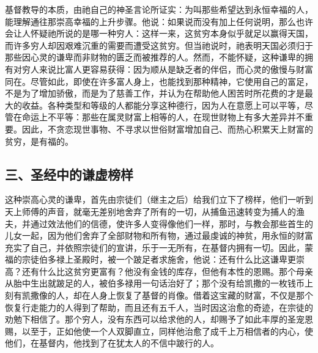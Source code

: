 基督教导的本质，由祂自己的神圣言论所证实：为叫那些希望达到永恒幸福的人，能理解通往那崇高幸福的上升步骤。他说：如果说而没有加上任何说明，那么也许会让人怀疑祂所说的是哪一种穷人：这样一来，这贫穷本身似乎就足以赢得天国，而许多穷人却因艰难沉重的需要而遭受这贫穷。但当祂说时，祂表明天国必须归于那些因心灵的谦卑而非财物的匮乏而被推荐的人。然而，不能怀疑，这种谦卑的拥有对穷人来说比富人更容易获得：因为顺从是缺乏者的伴侣，而心灵的傲慢与财富同在。尽管如此，即使在许多富人身上，也能找到那种精神，它使用自己的富足，不是为了增加骄傲，而是为了慈善工作，并认为在帮助他人困苦时所花费的才是最大的收益。各种类型和等级的人都能分享这种德行，因为人在意愿上可以平等，尽管在命运上不平等：那些在属灵财富上相等的人，在现世财物上有多大差异并不重要。因此，不贪恋现世事物、不寻求以世俗财富增加自己、而热心积累天上财富的贫穷，是有福的。\par


\subsection{三、圣经中的谦虚榜样}

这种崇高心灵的谦卑，首先由宗徒们（继主之后）给我们立下了榜样，他们一听到天上师傅的声音，就毫无差别地舍弃了所有的一切，从捕鱼迅速转变为捕人的渔夫，并通过效法他们的信德，使许多人变得像他们一样，那时，与教会那些首生的儿女一起，因为他们舍弃了全部财物和所有物，通过最虔诚的神贫，用永恒的财富充实了自己，并依照宗徒们的宣讲，乐于一无所有，在基督内拥有一切。因此，蒙福的宗徒伯多禄上圣殿时，被一个跛足者求施舍，他说：还有什么比这谦卑更崇高？还有什么比这贫穷更富有？他没有金钱的库存，但他有本性的恩赐。那个母亲从胎中生出就跛足的人，被伯多禄用一句话治好了；那个没有给凯撒的一枚钱币上刻有凯撒像的人，却在人身上恢复了基督的肖像。借着这宝藏的财富，不仅是那个恢复行走能力的人得到了帮助，而且还有五千人，当时因这治愈的奇迹，在宗徒的劝勉下相信了。那个穷人，没有东西可以给求他的人，却赐予了如此丰厚的圣宠恩赐，以至于，正如他使一个人双脚直立，同样他治愈了成千上万相信者的内心，使他们，在基督内，他找到了在犹太人的不信中跛行的人。\par


